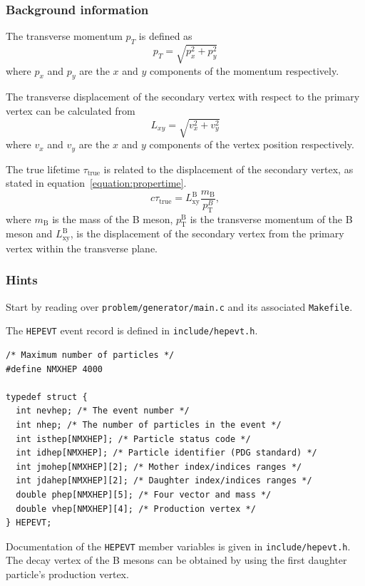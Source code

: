 \documentclass[11pt]{scrartcl}
\begin{document}
\subsubsection*{Background information}
The transverse momentum $p_T$ is defined as
\[p_T = \sqrt{p_x^2 + p_y^2} \]
where $p_x$ and $p_y$ are the $x$ and $y$ components of the
momentum respectively.

The transverse displacement of the secondary vertex with respect to
the primary vertex can be calculated from
\[ L_{xy} = \sqrt{v_x^2 + v_y^2} \]
where $v_x$ and $v_y$ are the $x$ and $y$ components of the
vertex position respectively.

The true lifetime $\tau_\mathrm{true}$ is related to the displacement of the
secondary vertex, as stated in equation~\ref{equation:propertime}.
\begin{equation}
c\tau_\mathrm{true} = L_\mathrm{xy}^\mathrm{B} \frac{m_\mathrm{B}}{p_\mathrm{T}^B},
\label{equation:propertime}
\end{equation}
where $m_\mathrm{B}$ is the mass of the B meson, $p_\mathrm{T}^\mathrm{B}$ is the transverse
momentum of the B meson and $L_\mathrm{xy}^\mathrm{B}$, is the displacement of the
secondary vertex from the primary vertex within the transverse plane.

\subsubsection*{Hints}
Start by reading over \texttt{problem/generator/main.c} and its
associated \texttt{Makefile}.

The \texttt{HEPEVT} event record is defined in \texttt{include/hepevt.h}.
\begin{lstlisting}
/* Maximum number of particles */
#define NMXHEP 4000

typedef struct {
  int nevhep; /* The event number */
  int nhep; /* The number of particles in the event */
  int isthep[NMXHEP]; /* Particle status code */
  int idhep[NMXHEP]; /* Particle identifier (PDG standard) */
  int jmohep[NMXHEP][2]; /* Mother index/indices ranges */
  int jdahep[NMXHEP][2]; /* Daughter index/indices ranges */
  double phep[NMXHEP][5]; /* Four vector and mass */
  double vhep[NMXHEP][4]; /* Production vertex */
} HEPEVT;
\end{lstlisting}
Documentation of the \texttt{HEPEVT} member variables is given in
\texttt{include/hepevt.h}.  The decay vertex of the B mesons can be
obtained by using the first daughter particle's production vertex.
\end{document}
